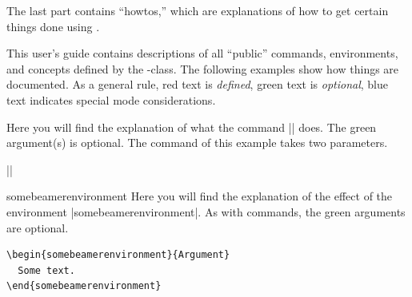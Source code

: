 The last part contains ``howtos,'' which are explanations of how to get certain things done using \beamer.

\medskip
\noindent
This user's guide contains descriptions of all ``public'' commands, environments, and concepts defined by the \beamer-class. The following examples show how things are documented. As a general rule, red text is \emph{defined}, green text is \emph{optional}, blue text indicates special mode considerations.

\begingroup
\noindexing
\begin{command}{\somebeamercommand{}}
  Here you will find the explanation of what the command |\somebeamercommand| does. The green argument(s) is optional. The command of this example takes two parameters.

  \example
  ||
\end{command}

\begin{environment}{{somebeamerenvironment}}
  Here you will find the explanation of the effect of the environment |somebeamerenvironment|. As with commands, the green arguments are optional.

  \example
\begin{verbatim}
\begin{somebeamerenvironment}{Argument}
  Some text.
\end{somebeamerenvironment}
\end{verbatim}
\end{environment}

